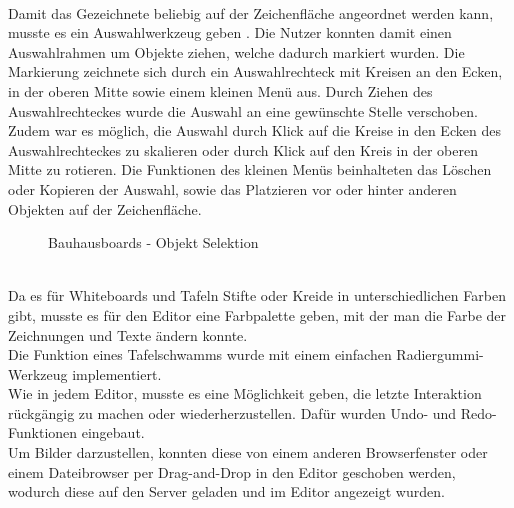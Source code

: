 \\
Damit das Gezeichnete beliebig auf der Zeichenfläche angeordnet werden kann, musste es ein Auswahlwerkzeug geben .
Die Nutzer konnten damit einen Auswahlrahmen um Objekte ziehen, welche dadurch markiert wurden.
Die Markierung zeichnete sich durch ein Auswahlrechteck mit Kreisen an den Ecken, in der oberen Mitte sowie einem kleinen Menü aus.
Durch Ziehen des Auswahlrechteckes wurde die Auswahl an eine gewünschte Stelle verschoben.
Zudem war es möglich, die Auswahl durch Klick auf die Kreise in den Ecken des Auswahlrechteckes zu skalieren oder durch Klick auf den Kreis in der oberen Mitte zu rotieren.
Die Funktionen des kleinen Menüs beinhalteten das Löschen oder Kopieren der Auswahl, sowie das Platzieren vor oder hinter anderen Objekten auf der Zeichenfläche.
\begin{figure}
  \centering
  \caption{Bauhausboards - Objekt Selektion}
  \label{img:editorObjectSelection}
\end{figure}
\\
Da es für Whiteboards und Tafeln Stifte oder Kreide in unterschiedlichen Farben gibt, musste es für den Editor eine Farbpalette geben, mit der man die Farbe der Zeichnungen und Texte ändern konnte.
\\
Die Funktion eines Tafelschwamms wurde mit einem einfachen Radiergummi-Werkzeug implementiert.
\\
Wie in jedem Editor, musste es eine Möglichkeit geben, die letzte Interaktion rückgängig zu machen oder wiederherzustellen. Dafür wurden Undo- und Redo-Funktionen eingebaut.
\\
Um Bilder darzustellen, konnten diese von einem anderen Browserfenster oder einem Dateibrowser per Drag-and-Drop in den Editor geschoben werden, wodurch diese auf den Server geladen und im Editor angezeigt wurden.
